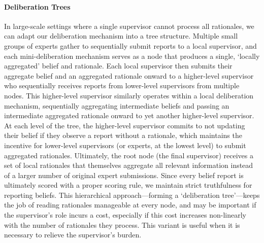 \documentclass{winnower}
\begin{document}
\paragraph{Deliberation Trees}
In large-scale settings where a single supervisor cannot process all rationales, we can adapt our deliberation mechanism into a tree structure. Multiple small groups of experts gather to sequentially submit reports to a local supervisor, and each mini-deliberation mechanism serves as a node that produces a single, `locally aggregated’ belief and rationale. Each local supervisor then submits their aggregate belief and an aggregated rationale onward to a higher-level supervisor who sequentially receives reports from lower-level supervisors from multiple nodes. This higher-level supervisor similarly operates within a local deliberation mechanism, sequentially aggregating intermediate beliefs and passing an intermediate aggregated rationale onward to yet another higher-level supervisor. At each level of the tree, the higher-level supervisor commits to not updating their belief if they observe a report without a rationale, which maintains the incentive for lower-level supervisors (or experts, at the lowest level) to submit aggregated rationales. Ultimately, the root node (the final supervisor) receives a set of local rationales that themselves aggregate all relevant information instead of a larger number of original expert submissions. Since every belief report is ultimately scored with a proper scoring rule, we maintain strict truthfulness for reporting beliefs. This hierarchical approach---forming a `deliberation tree’---keeps the job of reading rationales manageable at every node, and may be important if the supervisor's role incurs a cost, especially if this cost increases non-linearly with the number of rationales they process. 
This variant is useful when it is necessary to relieve the supervisor's burden. 
\end{document}
